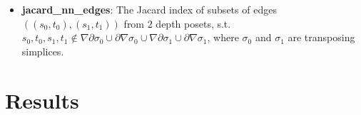 \documentclass{article}
\begin{document}
\begin{itemize}
\item \textbf{jacard\_nn\_edges}: The Jacard index of subsets of edges $((s_0, t_0), (s_1, t_1))$ from 2 depth posets, s.t.
$s_0, t_0, s_1, t_1 \notin \nabla\partial\sigma_0 \cup \partial\nabla\sigma_0 \cup \nabla\partial\sigma_1 \cup \partial\nabla\sigma_1$,
where $\sigma_0$ and $\sigma_1$ are transposing simplices.

\end{itemize}


\section{Results}
%
%
\end{document}
